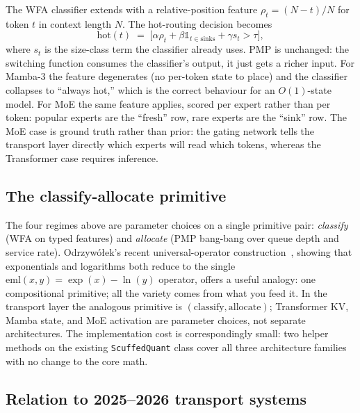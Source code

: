 \documentclass[11pt,letterpaper]{article}
\theoremstyle{definition}
\begin{document}
The WFA classifier extends with a relative-position feature
$\rho_t = (N-t)/N$ for token $t$ in context length $N$. The
hot-routing decision becomes
\[
  \mathrm{hot}(t) \;=\; \big[\alpha \rho_t + \beta \mathbb{1}_{t \in \text{sinks}} + \gamma s_t > \tau\big],
\]
where $s_t$ is the size-class term the classifier already uses. PMP
is unchanged: the switching function consumes the classifier's
output, it just gets a richer input. For Mamba-3 the feature
degenerates (no per-token state to place) and the classifier
collapses to ``always hot,'' which is the correct behaviour for an
$O(1)$-state model. For MoE the same feature applies, scored per
expert rather than per token: popular experts are the ``fresh'' row,
rare experts are the ``sink'' row. The MoE case is ground truth
rather than prior: the gating network tells the transport layer
directly which experts will read which tokens, whereas the
Transformer case requires inference.

\subsection{The classify-allocate primitive}
\label{sec:eml-primitive}

The four regimes above are parameter choices on a single primitive
pair: \emph{classify} (WFA on typed features) and \emph{allocate}
(PMP bang-bang over queue depth and service rate). Odrzyw{\'o}{\l}ek's
recent universal-operator construction~\cite{odrzywolek2026eml},
showing that exponentials and logarithms both reduce to the single
$\mathrm{eml}(x,y) = \exp(x) - \ln(y)$ operator, offers a useful
analogy: one compositional primitive; all the variety comes from
what you feed it. In the transport layer the analogous primitive is
$(\text{classify}, \text{allocate})$; Transformer KV, Mamba state,
and MoE activation are parameter choices, not separate
architectures. The implementation cost is correspondingly small:
two helper methods on the existing \texttt{ScuffedQuant} class
cover all three architecture families with no change to the core
math.

\subsection{Relation to 2025--2026 transport systems}
\label{sec:transport-related}
\end{document}
